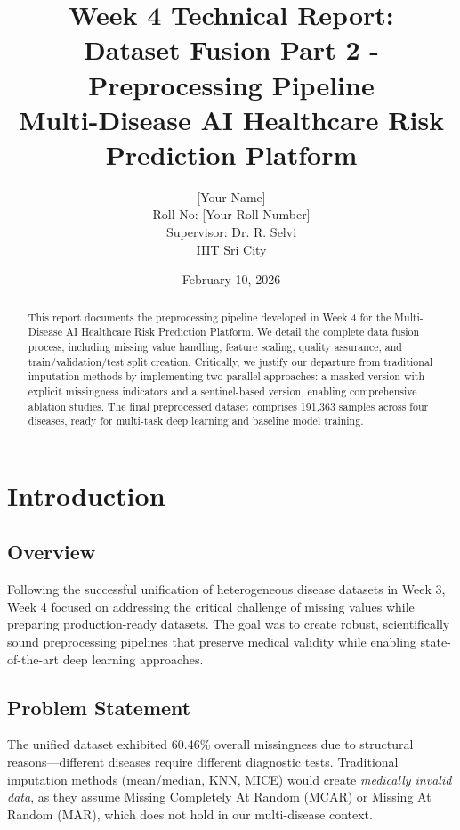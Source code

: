 \documentclass[12pt,a4paper]{article}
\title{\textbf{Week 4 Technical Report:} \\ 
       Dataset Fusion Part 2 - Preprocessing Pipeline \\ 
       \large Multi-Disease AI Healthcare Risk Prediction Platform}
\author{[Your Name] \\ Roll No: [Your Roll Number] \\ 
        Supervisor: Dr. R. Selvi \\ 
        IIIT Sri City}
\date{February 10, 2026}
\begin{document}
\maketitle

\begin{abstract}
This report documents the preprocessing pipeline developed in Week 4 for the Multi-Disease AI Healthcare Risk Prediction Platform. We detail the complete data fusion process, including missing value handling, feature scaling, quality assurance, and train/validation/test split creation. Critically, we justify our departure from traditional imputation methods by implementing two parallel approaches: a masked version with explicit missingness indicators and a sentinel-based version, enabling comprehensive ablation studies. The final preprocessed dataset comprises 191,363 samples across four diseases, ready for multi-task deep learning and baseline model training.
\end{abstract}

\tableofcontents
\newpage

\section{Introduction}

\subsection{Overview}
Following the successful unification of heterogeneous disease datasets in Week 3, Week 4 focused on addressing the critical challenge of missing values while preparing production-ready datasets. The goal was to create robust, scientifically sound preprocessing pipelines that preserve medical validity while enabling state-of-the-art deep learning approaches.

\subsection{Problem Statement}
The unified dataset exhibited 60.46\% overall missingness due to structural reasons---different diseases require different diagnostic tests. Traditional imputation methods (mean/median, KNN, MICE) would create \textit{medically invalid data}, as they assume Missing Completely At Random (MCAR) or Missing At Random (MAR), which does not hold in our multi-disease context.
\end{document}
